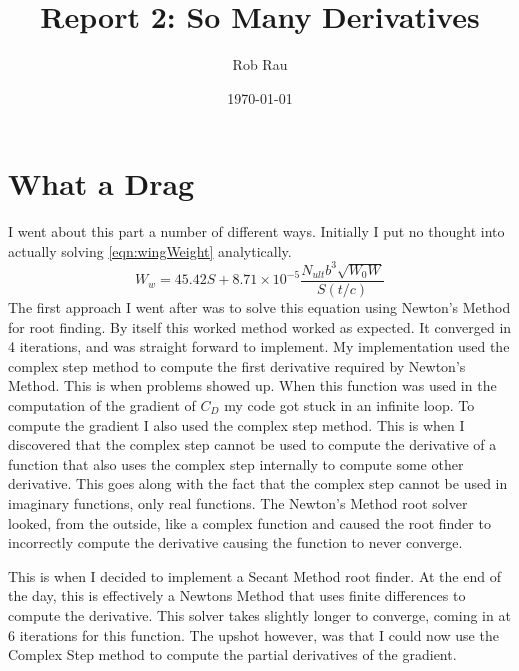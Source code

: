 \documentclass[12pt,parskip=full]{article}
\numberwithin{subsection}{section}
\begin{document}
	\vspace{-2ex}
	\title{Report 2: So Many Derivatives\vspace{-3.5ex}}
	\author{Rob Rau\vspace{-4ex}}
	\date{\today\vspace{-4ex}}
	\maketitle
	
	
	
	\section{What a Drag}
	
		I went about this part a number of different ways. Initially I put no thought into actually solving \cref{eqn:wingWeight} analytically.
		\begin{equation}\label{eqn:wingWeight}
			W_w = 45.42S + 8.71\times 10^{-5}\frac{N_{ult}b^3\sqrt{W_0 W}}{S(t/c)}
		\end{equation}
		The first approach I went after was to solve this equation using Newton's Method for root finding. By itself this worked method worked
		as expected. It converged in 4 iterations, and was straight forward to implement. My implementation used the complex step method to 
		compute the first derivative required by Newton's Method. This is when problems showed up. When this function was used in the computation
		of the gradient of $C_D$ my code got stuck in an infinite loop. To compute the gradient I also used the complex step method. This is when I
		discovered that the complex step cannot be used to compute the derivative of a function that also uses the complex step internally to
		compute some other derivative. This goes along with the fact that the complex step cannot be used in imaginary functions, only real functions.
		The Newton's Method root solver looked, from the outside, like a complex function and caused the root finder to incorrectly compute the
		derivative causing the function to never converge.
		
		This is when I decided to implement a Secant Method root finder. At the end of the day, this is effectively a Newtons Method that uses
		finite differences to compute the derivative. This solver takes slightly longer to converge, coming in at 6 iterations for this function.
		The upshot however, was that I could now use the Complex Step method to compute the partial derivatives of the gradient.
		
\end{document}
